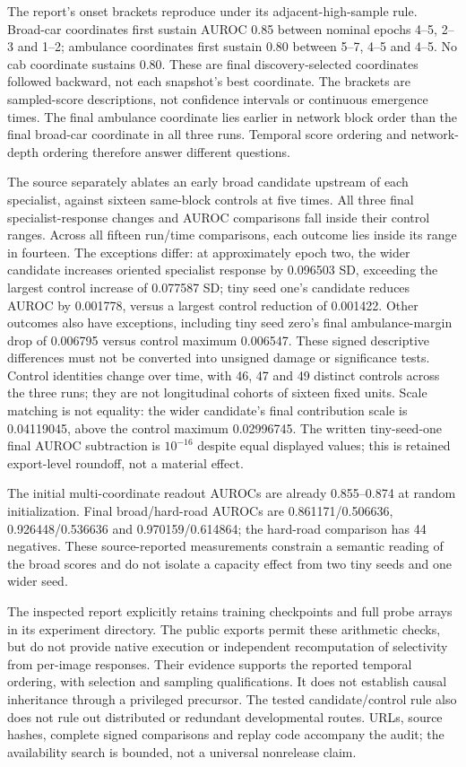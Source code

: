 \documentclass[
  british,
  11pt,
  a4paper,
]{article}
\begin{document}
The report's onset brackets reproduce under its adjacent-high-sample
rule. Broad-car coordinates first sustain AUROC 0.85 between nominal
epochs 4--5, 2--3 and 1--2; ambulance coordinates first sustain 0.80
between 5--7, 4--5 and 4--5. No cab coordinate sustains 0.80. These are
final discovery-selected coordinates followed backward, not each
snapshot's best coordinate. The brackets are sampled-score descriptions,
not confidence intervals or continuous emergence times. The final
ambulance coordinate lies earlier in network block order than the final
broad-car coordinate in all three runs. Temporal score ordering and
network-depth ordering therefore answer different questions.

The source separately ablates an early broad candidate upstream of each
specialist, against sixteen same-block controls at five times. All three
final specialist-response changes and AUROC comparisons fall inside
their control ranges. Across all fifteen run/time comparisons, each
outcome lies inside its range in fourteen. The exceptions differ: at
approximately epoch two, the wider candidate increases oriented
specialist response by 0.096503 SD, exceeding the largest control
increase of 0.077587 SD; tiny seed one's candidate reduces AUROC by
0.001778, versus a largest control reduction of 0.001422. Other outcomes
also have exceptions, including tiny seed zero's final ambulance-margin
drop of 0.006795 versus control maximum 0.006547. These signed
descriptive differences must not be converted into unsigned damage or
significance tests. Control identities change over time, with 46, 47 and
49 distinct controls across the three runs; they are not longitudinal
cohorts of sixteen fixed units. Scale matching is not equality: the
wider candidate's final contribution scale is 0.04119045, above the
control maximum 0.02996745. The written tiny-seed-one final AUROC
subtraction is \(10^{-16}\) despite equal displayed values; this is
retained export-level roundoff, not a material effect.

The initial multi-coordinate readout AUROCs are already 0.855--0.874 at
random initialization. Final broad/hard-road AUROCs are
0.861171/0.506636, 0.926448/0.536636 and 0.970159/0.614864; the
hard-road comparison has 44 negatives. These source-reported
measurements constrain a semantic reading of the broad scores and do not
isolate a capacity effect from two tiny seeds and one wider seed.

The inspected report explicitly retains training checkpoints and full
probe arrays in its experiment directory. The public exports permit
these arithmetic checks, but do not provide native execution or
independent recomputation of selectivity from per-image responses. Their
evidence supports the reported temporal ordering, with selection and
sampling qualifications. It does not establish causal inheritance
through a privileged precursor. The tested candidate/control rule also
does not rule out distributed or redundant developmental routes. URLs,
source hashes, complete signed comparisons and replay code accompany the
audit; the availability search is bounded, not a universal nonrelease
claim.
\end{document}

